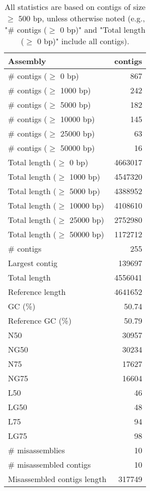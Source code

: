 \documentclass[12pt,a4paper]{article}
\begin{document}
\begin{table}[ht]
\begin{center}
\caption{All statistics are based on contigs of size $\geq$ 500 bp, unless otherwise noted (e.g., "\# contigs ($\geq$ 0 bp)" and "Total length ($\geq$ 0 bp)" include all contigs).}
\begin{tabular}{|l*{1}{|r}|}
\hline
Assembly & contigs \\ \hline
\# contigs ($\geq$ 0 bp) & 867 \\ \hline
\# contigs ($\geq$ 1000 bp) & 242 \\ \hline
\# contigs ($\geq$ 5000 bp) & 182 \\ \hline
\# contigs ($\geq$ 10000 bp) & 145 \\ \hline
\# contigs ($\geq$ 25000 bp) & 63 \\ \hline
\# contigs ($\geq$ 50000 bp) & 16 \\ \hline
Total length ($\geq$ 0 bp) & 4663017 \\ \hline
Total length ($\geq$ 1000 bp) & 4547320 \\ \hline
Total length ($\geq$ 5000 bp) & 4388952 \\ \hline
Total length ($\geq$ 10000 bp) & 4108610 \\ \hline
Total length ($\geq$ 25000 bp) & 2752980 \\ \hline
Total length ($\geq$ 50000 bp) & 1172712 \\ \hline
\# contigs & 255 \\ \hline
Largest contig & 139697 \\ \hline
Total length & 4556041 \\ \hline
Reference length & 4641652 \\ \hline
GC (\%) & 50.74 \\ \hline
Reference GC (\%) & 50.79 \\ \hline
N50 & 30957 \\ \hline
NG50 & 30234 \\ \hline
N75 & 17627 \\ \hline
NG75 & 16604 \\ \hline
L50 & 46 \\ \hline
LG50 & 48 \\ \hline
L75 & 94 \\ \hline
LG75 & 98 \\ \hline
\# misassemblies & 10 \\ \hline
\# misassembled contigs & 10 \\ \hline
Misassembled contigs length & 317749 \\ \hline

\end{tabular}
\end{center}
\end{table}
\end{document}
